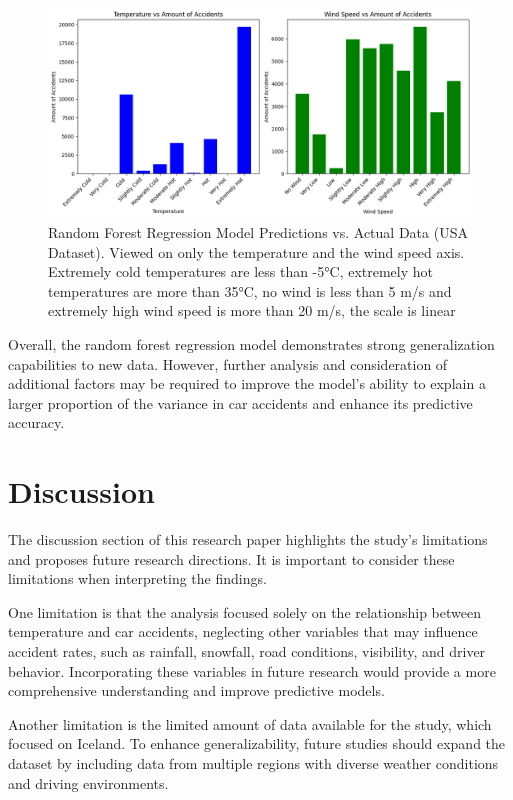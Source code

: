 \documentclass{article}
\begin{document}
\begin{figure}
    \centering
    \includegraphics[scale=0.4]{../figures/highres/usa_model_2d.png}
    \caption{Random Forest Regression Model Predictions vs. Actual Data (USA Dataset). Viewed on only the temperature  and the wind speed axis. Extremely cold temperatures are less than -5°C, extremely hot temperatures are more than 35°C, no wind is less than 5 m/s and extremely high wind speed is more than 20 m/s, the scale is linear}
    \label{fig:usa_model_2d}
\end{figure}


Overall, the random forest regression model demonstrates strong generalization capabilities to new data. However, further analysis and consideration of additional factors may be required to improve the model's ability to explain a larger proportion of the variance in car accidents and enhance its predictive accuracy.

\newpage
\section{Discussion}

The discussion section of this research paper highlights the study's limitations and proposes future research directions. It is important to consider these limitations when interpreting the findings.

One limitation is that the analysis focused solely on the relationship between temperature and car accidents, neglecting other variables that may influence accident rates, such as rainfall, snowfall, road conditions, visibility, and driver behavior. Incorporating these variables in future research would provide a more comprehensive understanding and improve predictive models.

Another limitation is the limited amount of data available for the study, which focused on Iceland. To enhance generalizability, future studies should expand the dataset by including data from multiple regions with diverse weather conditions and driving environments.
\end{document}

